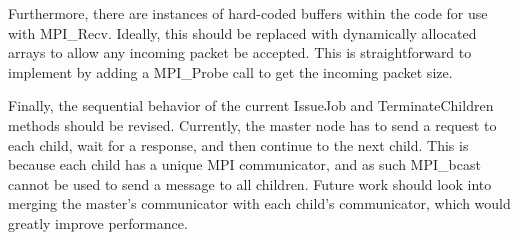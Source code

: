 \documentclass[11pt]{article}
\begin{document}
        Furthermore, there are instances of hard-coded buffers within the code for use with MPI\_Recv. Ideally,
        this should be replaced with dynamically allocated arrays to allow any incoming packet be accepted. This
        is straightforward to implement by adding a MPI\_Probe call to get the incoming packet size.
        
        Finally, the sequential behavior of the current IssueJob and TerminateChildren methods should be revised.
        Currently, the master node has to send a request to each child, wait for a response, and then continue
        to the next child. This is because each child has a unique MPI communicator, and as such MPI\_bcast cannot
        be used to send a message to all children. Future work should look into merging the master's communicator
        with each child's communicator, which would greatly improve performance. 
        

        
    
    
    
\end{document}
